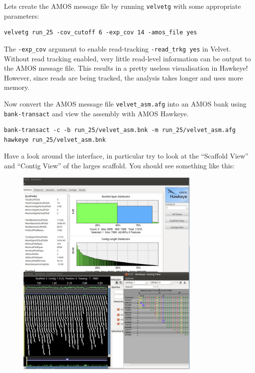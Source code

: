 \begin{steps}
Lets create the AMOS message file by running \texttt{velvetg} with some
appropriate parameters:
\begin{lstlisting}
velvetg run_25 -cov_cutoff 6 -exp_cov 14 -amos_file yes
\end{lstlisting}

\begin{note}
The \texttt{-exp\_cov} argument to enable read-tracking \texttt{-read\_trkg yes} in Velvet.
Without read tracking enabled, very little read-level information can be output
to the AMOS message file. This results in a pretty useless visualisation in
Hawkeye! However, since reads are being tracked, the analysis takes longer and
uses more memory.
\end{note}

Now convert the AMOS message file \texttt{velvet\_asm.afg} into an AMOS bank
using \texttt{bank-transact} and view the assembly with AMOS Hawkeye.
\begin{lstlisting}
bank-transact -c -b run_25/velvet_asm.bnk -m run_25/velvet_asm.afg
hawkeye run_25/velvet_asm.bnk
\end{lstlisting}

Have a look around the interface, in particular try to look at the ``Scaffold
View'' and ``Contig View'' of the larges scaffold. You should see something like
this:

\begin{figure}[H]
\centering
\includegraphics[width=0.8\textwidth]{de_novo/velvet/hawkeye_single_ended.png}
\caption{\label{fig:hawkeye_single_ended}}
\end{figure}

\end{steps}

